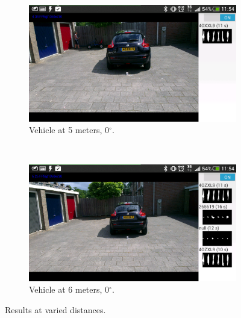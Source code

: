 \begin{figure}[ht]
        \begin{subfigure}{0.5\textwidth}
            \includegraphics[width=\textwidth]{plaatjes/test-5m-0a}
            \caption{Vehicle at 5 meters, 0$^{\circ}$.}
            \label{fig:5m-0a}
        \end{subfigure}%
        ~
        \begin{subfigure}{0.5\textwidth}
            \includegraphics[width=\textwidth]{plaatjes/test-6m-0a}
            \caption{Vehicle at 6 meters, 0$^{\circ}$.}
            \label{fig:6m-0a}
        \end{subfigure}%

        \caption{Results at varied distances.}
        \label{fig:distance-test}
\end{figure} %


